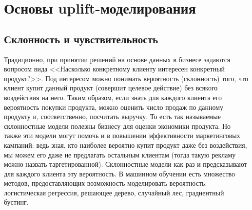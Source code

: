 \section{Основы uplift-моделирования}


\subsection{Склонность и чувствительность}

\iffalse
про продукты, про коммуникации и реакции на них, типы клиентов по реакциям
про модели склонности как основу всего и след уровень -- аплифт

    История возникновения аплифт моделирования.
    Основные понятия и определения.
    Отличия от традиционного моделирования.


------
\fi
Традиционно, при принятии решений на основе данных в бизнесе задаются вопросом вида <<Насколько конкретному клиенту интересен конкретный продукт?>>. Под интересом можно понимать вероятность (склонность) того, что клиент купит данный продукт (совершит целевое действие) без всякого воздействия на него. Таким образом, если знать для каждого клиента его вероятность покупки продукта, можно оценить число продаж по данному продукту и, соответственно, посчитать выручку. То есть так называемые склонностные модели полезны бизнесу для оценки экономики продукта. Но также эти модели могут помочь и в повышении эффективности маркетинговых кампаний: ведь зная, кто наиболее вероятно купит продукт даже без воздействия, мы можем его даже не предлагать остальным клиентам (тогда такую рекламу можно назвать таргетированной). Склонностные модели как раз и предсказывают для каждого клиента эту вероятность. В машинном обучении есть множество методов, предоставляющих возможность моделировать вероятность: логистическая регрессия, решающее дерево, случайный лес, градиентный бустинг.

